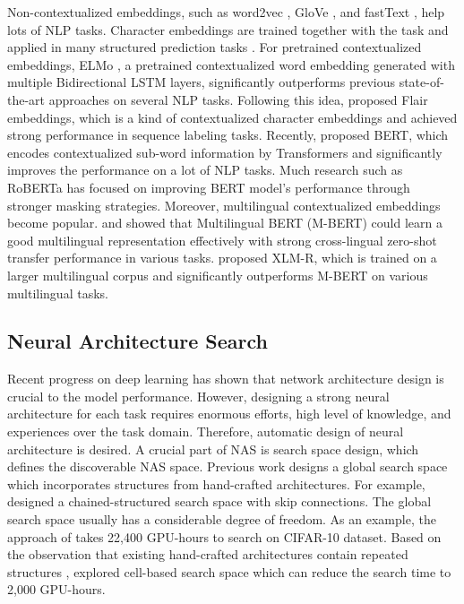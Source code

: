 \documentclass{article} \usepackage{iclr2021_conference,times}
\begin{document}
Non-contextualized embeddings, such as word2vec \citep{mikolov2013distributed}, GloVe \citep{pennington2014glove}, and fastText \citep{bojanowski2017enriching}, help lots of NLP tasks. 
Character embeddings \citep{santos2014learning} are trained together with the task and applied in many structured prediction tasks \citep{ma-hovy-2016-end,lample-etal-2016-neural,dozat-manning-2018-simpler}. 
For pretrained contextualized embeddings, ELMo \citep{peters-etal-2018-deep}, a pretrained contextualized word embedding generated with multiple Bidirectional LSTM layers, significantly outperforms previous state-of-the-art approaches on several NLP tasks. 
Following this idea, \citet{akbik-etal-2018-contextual} proposed Flair embeddings, which is a kind of contextualized character embeddings and achieved strong performance in sequence labeling tasks. 
Recently, \citet{devlin-etal-2019-bert} proposed BERT, which encodes contextualized sub-word information by Transformers and significantly improves the performance on a lot of NLP tasks. 
Much research such as RoBERTa \citep{liu2019roberta} has focused on improving BERT model's performance through stronger masking strategies. Moreover, multilingual contextualized embeddings become popular. \citet{pires-etal-2019-multilingual} and \citet{wu-dredze-2019-beto} showed that Multilingual BERT (M-BERT) could learn a good multilingual representation effectively with strong cross-lingual zero-shot transfer performance in various tasks. \citet{conneau-etal-2020-unsupervised} proposed XLM-R, which is trained on a larger multilingual corpus and significantly outperforms M-BERT on various multilingual tasks.

\subsection{Neural Architecture Search}
Recent progress on deep learning has shown that network architecture design is crucial to the model performance. 
However, designing a strong neural architecture for each task requires enormous efforts, high level of knowledge, and experiences over the task domain. 
Therefore, automatic design of neural architecture is desired. 
A crucial part of NAS is search space design, which defines the discoverable NAS space. 
Previous work \citep{baker2016designing,zoph2016neural,xie2017genetic} designs a global search space \citep{elsken2019neural} which incorporates structures from hand-crafted architectures. For example, \citet{zoph2016neural} designed a chained-structured search space with skip connections. 
The global search space usually has a considerable degree of freedom. As an example, the approach of \citet{zoph2016neural} takes 22,400 GPU-hours to search on CIFAR-10 dataset. Based on the observation that existing hand-crafted architectures contain repeated structures \citep{szegedy2016rethinking,he2016deep,huang2017densely}, \citet{zoph2018learning} explored cell-based search space which can reduce the search time to 2,000 GPU-hours. 
\end{document}
